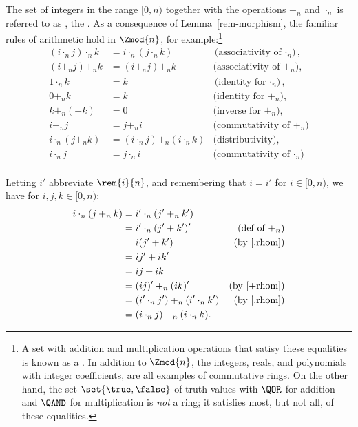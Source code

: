 The set of integers in the range $[0,n)$ together with the operations
  $+_n$ and $\cdot_n$ is referred to as , the
  .  As a consequence of
  Lemma~\ref{rem-morphism}, the familiar rules of arithmetic hold in
  $\Zmod{n}$, for example:\footnote{A set with addition and
    multiplication operations that satisy these equalities is known as
    a .  In addition to $\Zmod{n}$, the
    integers, reals, and polynomials with integer coefficients, are
    all examples of commutative rings.  On the other hand, the set
    $\set{\true, \false}$ of truth values with $\QOR$ for addition and
    $\QAND$ for multiplication is \emph{not} a ring; it satisfies
    most, but not all, of these equalities.}
\begin{align*}
(i \cdot_n j) \cdot_n k & = i \cdot_n (j \cdot_n k)
       & \text{(associativity of $\cdot_n$)},\\
        (i +_n j) +_n k & = (i +_n j) +_n k
       & \text{(associativity of $+_n$)},\\
           1 \cdot_n k  & = k
       & \text{(identity for $\cdot_n$)},\\
              0 +_n k  & = k
       & \text{(identity for $+_n$)},\\
           k +_n (-k)  & = 0
       & \text{(inverse for $+_n$)},\\
                i +_n j & = j +_n i
       & \text{(commutativity of $+_n$)}\\
    i \cdot_n (j +_n k) & = (i \cdot_n j) +_n (i \cdot_n k)
       & \text{(distributivity)},\\
            i \cdot_n j & = j \cdot_n i
       & \text{(commutativity of $\cdot_n$)}\\
\end{align*}

\begin{editingnotes}
Letting $i'$ abbreviate $\rem{i}{n}$, and remembering that $i = i'$
for $i \in [0,n)$, we have for $i,j,k \in [0,n)$:
\begin{align*}
i \cdot_n (j +_n k) & = i' \cdot_n (j' +_n k')\\
   & = i' \cdot_n (j' + k')' & \text{(def of $+_n$)}\\
   & = i (j' + k') & \text{(by~\eqref{.rhom})}\\  %
   & = i j' + i k'\\
   & = ij + ik\\
   & = (ij)' +_n (ik)' & \text{(by~\eqref{+rhom})}\\  %
   & = (i' \cdot_ n j') +_n (i' \cdot_ n k') & \text{(by~\eqref{.rhom})}\\
   & = (i \cdot_ n j) +_n (i \cdot_ n k).
\end{align*}
\end{editingnotes}


